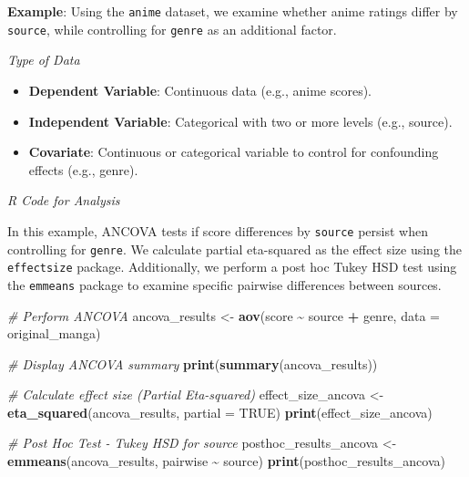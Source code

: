 \documentclass[
]{book}
\newenvironment{Shaded}{\begin{snugshade}}{\end{snugshade}}
\newcommand{\AttributeTok}[1]{\textcolor[rgb]{0.13,0.29,0.53}{#1}}
\newcommand{\CommentTok}[1]{\textcolor[rgb]{0.56,0.35,0.01}{\textit{#1}}}
\newcommand{\ConstantTok}[1]{\textcolor[rgb]{0.56,0.35,0.01}{#1}}
\newcommand{\FunctionTok}[1]{\textcolor[rgb]{0.13,0.29,0.53}{\textbf{#1}}}
\newcommand{\NormalTok}[1]{#1}
\newcommand{\OtherTok}[1]{\textcolor[rgb]{0.56,0.35,0.01}{#1}}
\newcommand{\SpecialCharTok}[1]{\textcolor[rgb]{0.81,0.36,0.00}{\textbf{#1}}}
\providecommand{\tightlist}{%
  \setlength{\itemsep}{0pt}\setlength{\parskip}{0pt}}
\begin{document}
\textbf{Example}: Using the \texttt{anime} dataset, we examine whether anime ratings differ by \texttt{source}, while controlling for \texttt{genre} as an additional factor.

\emph{Type of Data}

\begin{itemize}
\tightlist
\item
  \textbf{Dependent Variable}: Continuous data (e.g., anime scores).
\item
  \textbf{Independent Variable}: Categorical with two or more levels (e.g., source).
\item
  \textbf{Covariate}: Continuous or categorical variable to control for confounding effects (e.g., genre).
\end{itemize}

\emph{R Code for Analysis}

In this example, ANCOVA tests if score differences by \texttt{source} persist when controlling for \texttt{genre}. We calculate partial eta-squared as the effect size using the \texttt{effectsize} package. Additionally, we perform a post hoc Tukey HSD test using the \texttt{emmeans} package to examine specific pairwise differences between sources.

\begin{Shaded}
\begin{Highlighting}[]
\CommentTok{\# Perform ANCOVA}
\NormalTok{ancova\_results }\OtherTok{\textless{}{-}} \FunctionTok{aov}\NormalTok{(score }\SpecialCharTok{\textasciitilde{}}\NormalTok{ source }\SpecialCharTok{+}\NormalTok{ genre, }\AttributeTok{data =}\NormalTok{ original\_manga)}

\CommentTok{\# Display ANCOVA summary}
\FunctionTok{print}\NormalTok{(}\FunctionTok{summary}\NormalTok{(ancova\_results))}

\CommentTok{\# Calculate effect size (Partial Eta{-}squared)}
\NormalTok{effect\_size\_ancova }\OtherTok{\textless{}{-}} \FunctionTok{eta\_squared}\NormalTok{(ancova\_results, }\AttributeTok{partial =} \ConstantTok{TRUE}\NormalTok{)}
\FunctionTok{print}\NormalTok{(effect\_size\_ancova)}

\CommentTok{\# Post Hoc Test {-} Tukey HSD for source}
\NormalTok{posthoc\_results\_ancova }\OtherTok{\textless{}{-}} \FunctionTok{emmeans}\NormalTok{(ancova\_results, pairwise }\SpecialCharTok{\textasciitilde{}}\NormalTok{ source)}
\FunctionTok{print}\NormalTok{(posthoc\_results\_ancova)}
\end{Highlighting}
\end{Shaded}
\end{document}
